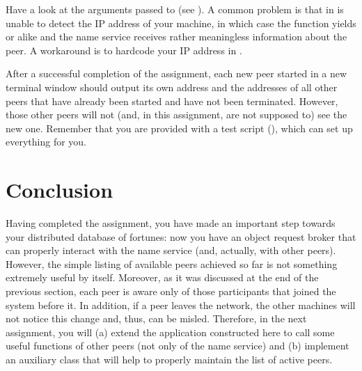 \documentclass[a4paper]{article}
\begin{document}
Have a look at the arguments passed to  (see ). A
common problem is that  in  is
unable to detect the IP address of your machine, in which case the function
yields  or alike and the name service receives rather
meaningless information about the peer. A workaround is to hardcode your IP
address in .

After a successful completion of the assignment, each new peer started in a new
terminal window should output its own address and the addresses of all other
peers that have already been started and have not been terminated. However,
those other peers will not (and, in this assignment, are not supposed to) see
the new one. Remember that you are provided with a test script
(), which can set up everything for you.

\section{Conclusion}
Having completed the assignment, you have made an important step towards your
distributed database of fortunes: now you have an object request broker that can
properly interact with the name service (and, actually, with other peers).
However, the simple listing of available peers achieved so far is not something
extremely useful by itself. Moreover, as it was discussed at the end of the
previous section, each peer is aware only of those participants that joined the
system before it. In addition, if a peer leaves the network, the other machines
will not notice this change and, thus, can be misled. Therefore, in the next
assignment, you will (a) extend the application constructed here to call some
useful functions of other peers (not only of the name service) and (b) implement
an auxiliary class that will help to properly maintain the list of active peers.

\printbibliography
\end{document}
